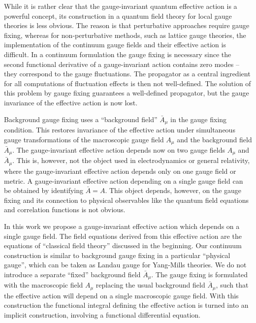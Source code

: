 \documentclass[twocolumn,aps,prd,amsmath,amssymb,preprintnumbers,longbibliography]{revtex4-1}
\numberwithin{equation}{section}
\newcounter{condition}[equation]
\begin{document}
While it is rather clear that the gauge-invariant quantum effective action is a powerful concept, its construction in a quantum field theory for local gauge theories is less obvious. The reason is that perturbative approaches require gauge fixing, whereas for non-perturbative methods, such as lattice gauge theories, the implementation of the continuum gauge fields and their effective action is difficult. In a continuum formulation the gauge fixing is necessary since the second functional derivative of a gauge-invariant action contains zero modes -- they correspond to the gauge fluctuations. The propagator as a central ingredient for all computations of fluctuation effects is then not well-defined. The solution of this problem by gauge fixing guarantees a well-defined propagator, but the gauge invariance of the effective action is now lost.

Background gauge fixing \cite{GH,BDW,BB,LA} uses a ``background field'' $\bar{A}_{\mu}$ in the gauge fixing condition. This restores invariance of the effective action under simultaneous gauge transformations of the macroscopic gauge field $A_\mu$ and the background field $\bar{A}_\mu$. The gauge-invariant effective action depends now on two gauge fields $A_\mu$ and $\bar{A}_\mu$. This is, however, not the object used in electrodynamics or general relativity, where the gauge-invariant effective action depends only on one gauge field or metric. A gauge-invariant effective action depending on a single gauge field can be obtained by identifying $\bar{A} = A$. This object depends, however, on the gauge fixing and its connection to physical observables like the quantum field equations and correlation functions is not obvious.

In this work we propose a gauge-invariant effective action which depends on a single gauge field. The field equations derived from this effective action are the equations of ``classical field theory'' discussed in the beginning. Our continuum construction is similar to background gauge fixing in a particular ``physical gauge'', which can be taken as Landau gauge for Yang-Mills theories. We do not introduce a separate ``fixed'' background field $\bar{A}_\mu$. The gauge fixing is formulated with the macroscopic field $A_\mu$ replacing the usual background field $\bar{A}_\mu$, such that the effective action will depend on a single macroscopic gauge field. With this construction the functional integral defining the effective action is turned into an implicit construction, involving a functional differential equation.
\end{document}
